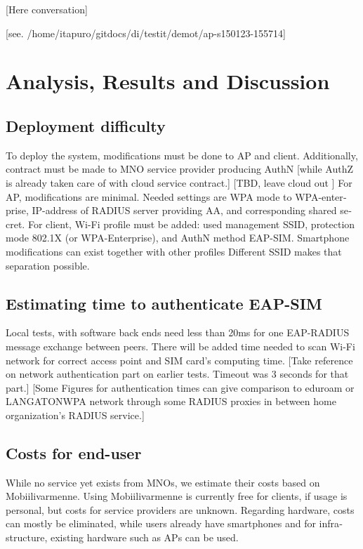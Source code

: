 \documentclass[12pt,a4paper,english]{tutthesis}
\begin{document}
\begin{otherlanguage}{english}
[Here conversation]



[see. /home/itapuro/gitdocs/di/testit/demot/ap-s150123-155714]


\chapter{Analysis, Results and Discussion}
\label{sec-6}



\section{Deployment difficulty}
\label{sec-6-1}

To deploy the system, modifications must be done to AP and client.
Additionally, contract must be made to MNO service
provider producing AuthN [while AuthZ is already taken care of with
cloud service contract.]  [TBD, leave cloud out ]
For AP, modifications are minimal. Needed settings are
WPA mode to WPA-enterprise, IP-address of RADIUS server providing 
AA, and corresponding shared secret.
For client, Wi-Fi profile must be added: used management SSID,
protection mode 802.1X (or WPA-Enterprise), and AuthN method EAP-SIM.
Smartphone modifications can exist together with other
profiles  Different SSID makes that separation possible.

\section{Estimating time to authenticate EAP-SIM}
\label{sec-6-2}
Local tests, with software back ends need less than 20ms for one EAP-RADIUS message
exchange between peers. There will be added time needed to scan Wi-Fi
network for correct access point and SIM card's computing
time.
 [Take reference on network authentication part on earlier
tests. Timeout was 3 seconds for that part.]
[Some Figures for authentication times can give comparison to eduroam
or LANGATONWPA network through some RADIUS proxies in between home
organization's RADIUS service.]

\section{Costs for end-user}
\label{sec-6-3}
While no service yet exists from MNOs, we estimate their costs based on
Mobiilivarmenne. Using Mobiilivarmenne 
is currently free for clients, if usage is personal, but costs
for service providers are unknown. 
Regarding hardware, costs can mostly be eliminated, while users
already have smartphones and for infrastructure, existing hardware
such as APs can be used.


\end{otherlanguage}
\end{document}
